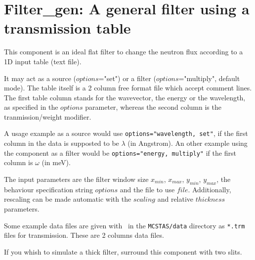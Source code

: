 \section{Filter\_gen: A general filter using a transmission table}
\label{filter-gen}


This component is an ideal flat filter to change the neutron flux according to a 1D input table (text file).

It may act as a source ($options$="set") or a filter ($options$="multiply", default mode). The table itself is a 2 column free format file which accept comment lines. The first table column stands for the wavevector, the energy or the wavelength, as specified in the $options$ parameter, whereas the second column is the tranmission/weight modifier.

A usage example as a source would use \verb+options="wavelength, set"+, if the first column in the data is supposted to be $\lambda$ (in Angstrom). An other example using the component as a filter would be \verb+options="energy, multiply"+ if the first column is $\omega$ (in meV).

The input parameters are the filter window size $x_{min}$, $x_{max}$, $y_{min}$, $y_{max}$, the behaviour specification string $options$ and the file to use $file$. Additionally, rescaling can be made automatic with the $scaling$ and relative $thickness$ parameters.

Some example data files are given with \MCS\ in the \verb+MCSTAS/data+ directory as \verb+*.trm+ files for transmission. These are 2 columns data files.

If you whish to simulate a thick filter, surround this component with two slits.